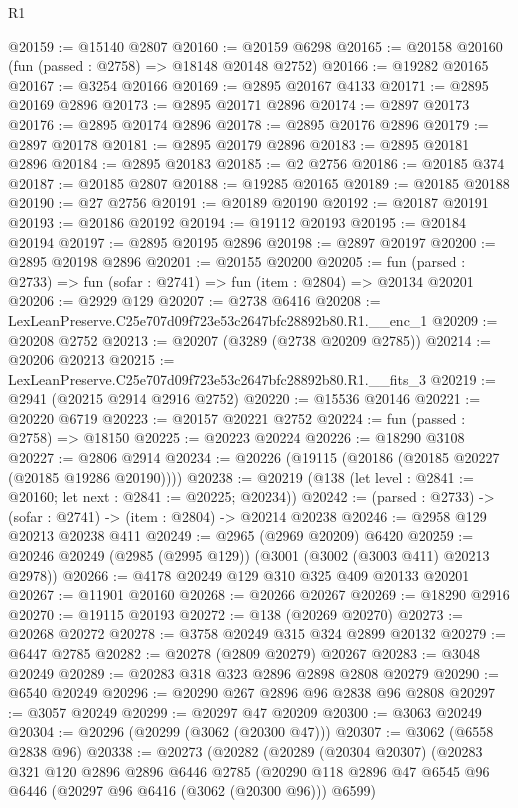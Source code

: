 \begin{lexlean}{R1}
\begin{coremodule}
@20159 := @15140 @2807
@20160 := @20159 @6298
@20165 := @20158 @20160 (fun (passed : @2758) => @18148 @20148 @2752)
@20166 := @19282 @20165
@20167 := @3254 @20166
@20169 := @2895 @20167 @4133
@20171 := @2895 @20169 @2896
@20173 := @2895 @20171 @2896
@20174 := @2897 @20173
@20176 := @2895 @20174 @2896
@20178 := @2895 @20176 @2896
@20179 := @2897 @20178
@20181 := @2895 @20179 @2896
@20183 := @2895 @20181 @2896
@20184 := @2895 @20183
@20185 := @2 @2756
@20186 := @20185 @374
@20187 := @20185 @2807
@20188 := @19285 @20165
@20189 := @20185 @20188
@20190 := @27 @2756
@20191 := @20189 @20190
@20192 := @20187 @20191
@20193 := @20186 @20192
@20194 := @19112 @20193
@20195 := @20184 @20194
@20197 := @2895 @20195 @2896
@20198 := @2897 @20197
@20200 := @2895 @20198 @2896
@20201 := @20155 @20200
@20205 := fun (parsed : @2733) => fun (sofar : @2741) => fun (item : @2804) => @20134 @20201
@20206 := @2929 @129
@20207 := @2738 @6416
@20208 := LexLeanPreserve.C25e707d09f723e53c2647bfc28892b80.R1.__enc_1
@20209 := @20208 @2752
@20213 := @20207 (@3289 (@2738 @20209 @2785))
@20214 := @20206 @20213
@20215 := LexLeanPreserve.C25e707d09f723e53c2647bfc28892b80.R1.__fits_3
@20219 := @2941 (@20215 @2914 @2916 @2752)
@20220 := @15536 @20146
@20221 := @20220 @6719
@20223 := @20157 @20221 @2752
@20224 := fun (passed : @2758) => @18150
@20225 := @20223 @20224
@20226 := @18290 @3108
@20227 := @2806 @2914
@20234 := @20226 (@19115 (@20186 (@20185 @20227 (@20185 @19286 @20190))))
@20238 := @20219 (@138 (let level : @2841 := @20160; let next : @2841 := @20225; @20234))
@20242 := (parsed : @2733) -> (sofar : @2741) -> (item : @2804) -> @20214 @20238
@20246 := @2958 @129 @20213 @20238 @411
@20249 := @2965 (@2969 @20209) @6420
@20259 := @20246 @20249 (@2985 (@2995 @129)) (@3001 (@3002 (@3003 @411) @20213 @2978))
@20266 := @4178 @20249 @129 @310 @325 @409 @20133 @20201
@20267 := @11901 @20160
@20268 := @20266 @20267
@20269 := @18290 @2916
@20270 := @19115 @20193
@20272 := @138 (@20269 @20270)
@20273 := @20268 @20272
@20278 := @3758 @20249 @315 @324 @2899 @20132
@20279 := @6447 @2785
@20282 := @20278 (@2809 @20279) @20267
@20283 := @3048 @20249
@20289 := @20283 @318 @323 @2896 @2898 @2808 @20279
@20290 := @6540 @20249
@20296 := @20290 @267 @2896 @96 @2838 @96 @2808
@20297 := @3057 @20249
@20299 := @20297 @47 @20209
@20300 := @3063 @20249
@20304 := @20296 (@20299 (@3062 (@20300 @47)))
@20307 := @3062 (@6558 @2838 @96)
@20338 := @20273
    (@20282
      (@20289
        (@20304 @20307)
        (@20283
          @321
          @120
          @2896
          @2896
          @6446
          @2785
          (@20290 @118 @2896 @47 @6545 @96 @6446 (@20297 @96 @6416 (@3062 (@20300 @96))) @6599)

\end{coremodule}
\end{lexlean}
